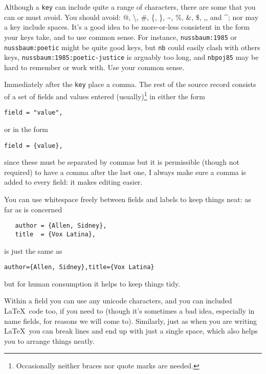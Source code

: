 {\newcommand{\romcom}{{\normalfont , }}
Although a \verb|key| can include quite a range of characters, there are some that you can or must avoid. You should avoid: {\ttfamily \textquotedbl\romcom @\romcom \textquotesingle\romcom \textbackslash\romcom \#\romcom \{\romcom \}\romcom \textasciitilde\romcom \%\romcom \textunderscore\romcom \&\romcom \$\romcom ,\romcom {\normalfont and }\^{}}; nor may a key include spaces. It's a good idea to be more-or-less consistent in the form your keys take, and to use common sense. For instance, \texttt{nussbaum:1985} or \texttt{nussbaum:poetic} might be quite good keys, but \texttt{nb} could easily clash with others keys, \texttt{nussbaum:1985:poetic-justice} is arguably too long, and \texttt{nbpoj85} may be hard to remember or work with. Use your common sense.

Immediately after the \verb|key| place a comma. The rest of the source record consists of a set of fields and values entered (usually)\footnote{Occasionally neither braces nor quote marks are needed.} in either the form
\begin{center}\texttt{field = "value",}\end{center}
or in the form
\begin{center}\texttt{field = \{value\},}\end{center}
since these must be separated by commas but it is permissible (though not required) to have a comma after the last one, I always make sure a comma is added to every field: it makes editing easier.

You can use whitespace freely between fields and labels to keep things neat: as far as  is concerned
\begin{verbatim}
   author = {Allen, Sidney},
   title  = {Vox Latina},
\end{verbatim}
is just the same as
\begin{verbatim}
author={Allen, Sidney},title={Vox Latina}
\end{verbatim}
but for human consumption it helps to keep things tidy.

Within a field you can use any unicode characters, and you can included \LaTeX\ code too, if you need to (though it's sometimes a bad idea, especially in name fields, for reasons we will come to). Similarly, just as when you are writing \LaTeX\, you can break lines and end up with just a single space, which also helps you to arrange things neatly.

}

